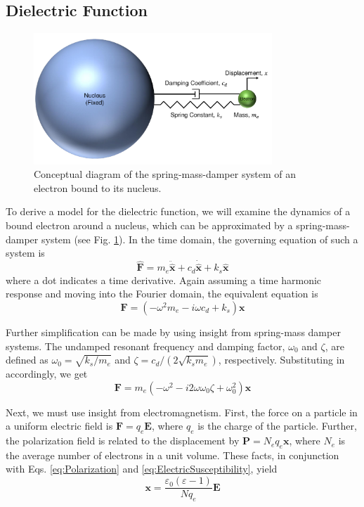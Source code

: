 \subsection{Dielectric Function}
%
\begin{figure}
\centering
\includegraphics[width=0.8\textwidth]{./Figures/SpringMassDamper.pdf}
\caption{\label{fig:SpringMassDamper}Conceptual diagram of the spring-mass-damper system of an electron bound to its nucleus.}
\end{figure}
%
To derive a model for the dielectric function, we will examine the dynamics of a bound electron around a nucleus, which can be approximated by a spring-mass-damper system (see Fig. \ref{fig:SpringMassDamper}). In the time domain, the governing equation of such a system is
%
\begin{equation}
\widehat{\boldsymbol{F}} = m_{e} \ddot{\widehat{\boldsymbol{x}}} + c_{d} \dot{\widehat{\boldsymbol{x}}} + k_{s} \widehat{\boldsymbol{x}}
\end{equation}
%
where a dot indicates a time derivative. Again assuming a time harmonic response and moving into the Fourier domain, the equivalent equation is
%
\begin{equation}
\boldsymbol{F} = \left( - \omega^{2} m_{e} - i \omega c_{d} + k_{s} \right) \boldsymbol{x}
\end{equation}

Further simplification can be made by using insight from spring-mass damper systems. The undamped resonant frequency and damping factor, $\omega_{0}$ and $\zeta$, are defined as $\omega_{0} = \sqrt{k_{s}/m_{e}}$ and $\zeta = c_{d}/(2\sqrt{k_{s}m_{e}})$, respectively. Substituting in accordingly, we get
%
\begin{equation}
\boldsymbol{F} = m_{e} \left( - \omega^{2} - i2 \omega \omega_{0} \zeta + \omega_{0}^{2} \right) \boldsymbol{x}
\end{equation}

Next, we must use insight from electromagnetism. First, the force on a particle in a uniform electric field is $\boldsymbol{F} = q_{e} \boldsymbol{E}$, where $q_{e}$ is the charge of the particle. Further, the polarization field is related to the displacement by $\boldsymbol{P} = N_{e} q_{e} \boldsymbol{x}$, where $N_{e}$ is the average number of electrons in a unit volume. These facts, in conjunction with Eqs. \ref{eq:Polarization} and \ref{eq:ElectricSusceptibility}, yield
%
\begin{equation}
\boldsymbol{x} = \frac{\varepsilon_{0} \left( \varepsilon - 1 \right)}{N q_{e}} \boldsymbol{E}
\end{equation}


